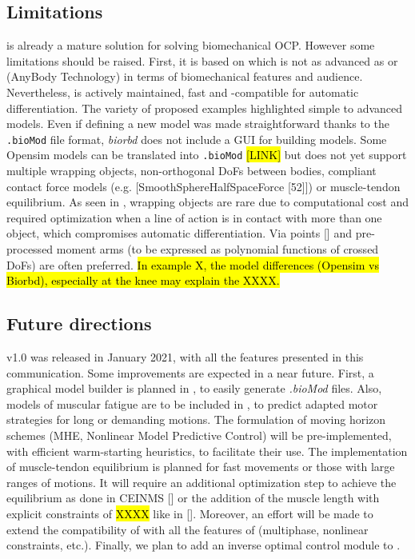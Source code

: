 \subsection{Limitations}

\bioptim is already a mature solution for solving biomechanical OCP. 
However some limitations should be raised. 
First, it is based on  \biorbd which is not as advanced as \opensim or \anybody (AnyBody Technology) in terms of biomechanical features and audience.
Nevertheless,  \biorbd is actively maintained, fast and \casadi-compatible for automatic differentiation.
The variety of proposed examples highlighted simple to advanced models.
Even if defining a new model was made straightforward thanks to the \texttt{.bioMod} file format, \textit{biorbd} does not include a GUI for building models. 
Some Opensim models can be translated into \texttt{.bioMod} \hl{[LINK]} but \biorbd does not yet support multiple wrapping objects, non-orthogonal DoFs between bodies, compliant contact force models (e.g. [SmoothSphereHalfSpaceForce [52]]) or muscle-tendon equilibrium. 
As seen in \moco, wrapping objects are rare due to computational cost and required optimization when a line of action is in contact with more than one object, which compromises automatic differentiation. 
Via points [\addref] and pre-processed moment arms (to be expressed as polynomial functions of crossed DoFs) are often preferred. 
\hl{In example X, the model differences (Opensim vs Biorbd), especially at the knee may explain the XXXX.} 


\subsection{Future directions}

\bioptim v1.0 was released in January 2021, with all the features presented in this communication.
Some improvements are expected in a near future.
First, a graphical model builder is planned in \biorbd, to easily generate \textit{.bioMod} files.
Also, models of muscular fatigue are to be included in \bioptim, to predict adapted motor strategies for long or demanding motions.
The formulation of moving horizon schemes (MHE, Nonlinear Model Predictive Control) will be pre-implemented, with efficient warm-starting heuristics, to facilitate their use.
The implementation of muscle-tendon equilibrium is planned for fast movements or those with large ranges of motions. 
It will require an additional optimization step to achieve the equilibrium as done in CEINMS [\addref] or the addition of the  muscle length with explicit constraints of \hl{XXXX} like in [\addref].  
Moreover, an effort will be made to extend the compatibility of \acados with all the features of \bioptim (multiphase, nonlinear constraints, etc.). 
Finally, we plan to add an inverse optimal control module to \bioptim.
